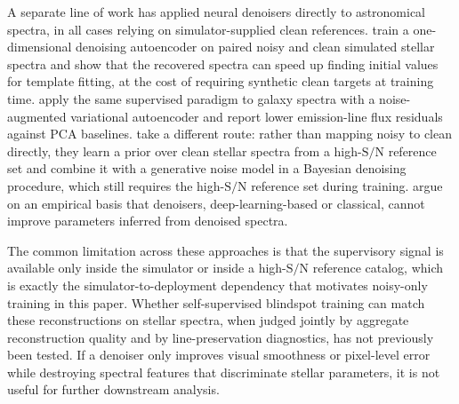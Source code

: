 \documentclass[twocolumn]{aastex7}
\newcommand{\ld}[1]{\textcolor{red}{\textbf{#1}}}
\newcommand{\SNR}{\mathrm{S}/\mathrm{N}}
\begin{document}
A separate line of work has applied neural denoisers directly to astronomical spectra, in all cases relying on simulator-supplied clean references. \citet{Pal2024_denoising_autoencoder} train a one-dimensional denoising autoencoder on paired noisy and clean simulated stellar spectra and show that the recovered spectra can speed up finding initial values for template fitting, at the cost of requiring synthetic clean targets at training time. \citet{Scourfield2023_AEgalaxies} apply the same supervised paradigm to galaxy spectra with a noise-augmented variational autoencoder and report lower emission-line flux residuals against PCA baselines. \citet{Kang2021_bayesian_spectrum_denoise} take a different route: rather than mapping noisy to clean directly, they learn a prior over clean stellar spectra from a high-$\SNR$ reference set and combine it with a generative noise model in a Bayesian denoising procedure, which still requires the high-$\SNR$ reference set during training. \citet{Gebran2025_denoising} argue on an empirical basis that denoisers, deep-learning-based or classical, cannot improve parameters inferred from denoised spectra.

The common limitation across these approaches is that the supervisory signal is available only inside the simulator or inside a high-$\SNR$ reference catalog, which is exactly the simulator-to-deployment dependency that motivates noisy-only training in this paper. Whether self-supervised blindspot training can match these reconstructions on stellar spectra, when judged jointly by aggregate reconstruction quality and by line-preservation diagnostics, has not previously been tested. If a denoiser only improves visual smoothness or pixel-level error while destroying spectral features that discriminate stellar parameters, it is not useful for further downstream analysis.

\end{document}
